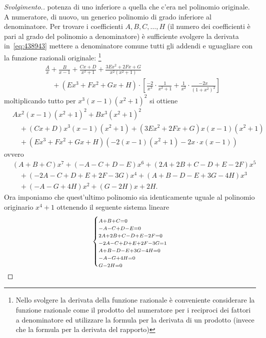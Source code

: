 \begin{proof}[Svolgimento.]
potenza di uno inferiore a quella che c'era nel polinomio originale.
A numeratore, di nuovo, un generico polinomio di grado inferiore al denominatore.
Per trovare i coefficienti $A,B,C, \dots, H$ (il numero dei coefficienti è pari al grado del polinomio a denominatore) è sufficiente
svolgere la derivata in~\eqref{eq:438943} mettere a denominatore
comune tutti gli addendi e uguagliare con la funzione razionali originale:
\footnote{%
Nello svolgere la derivata della funzione razionale è conveniente
considerare la funzione razionale come il prodotto del numeratore
per i reciproci dei fattori a denominatore ed utilizzare la formula
per la derivata di un prodotto (invece che la formula per la derivata del rapporto)%
}
\begin{align*}
  &\frac{A}{x} + \frac{B}{x-1} + \frac{Cx+D}{x^2+1}
  + \frac{3 E x^2 + 2 F x + G}{x^2(x^2+1)} \\
  & \quad + (E x^3 + F x^2 + G x + H)\cdot \left[\frac{-2}{x^3}\cdot \frac{1}{x^2+1}
  + \frac{1}{x^2}\cdot\frac{-2x}{(1+x^2)^2}\right]
\end{align*}
moltiplicando tutto per $x^3(x-1)(x^2+1)^2$ si ottiene
\begin{align*}
  &Ax^2(x-1)(x^2+1)^2 + Bx^3(x^2+1)^2 \\
  &\quad + (Cx+D)x^3(x-1)(x^2+1) + (3Ex^2+2Fx+G)x(x-1)(x^2+1)\\
  &\quad + (Ex^3+Fx^2+Gx+H)(-2(x-1)(x^2+1)-2x\cdot x(x-1))
\end{align*}
ovvero
\begin{align*}
  &(A+B+C)x^7+(-A-C+D-E)x^6 + (2A+2B+C-D+E-2F)x^5 \\
  &\quad  +(-2A-C+D+E+2F-3G)x^4 + (A+B-D-E+3G-4H)x^3 \\
  &\quad  + (-A-G+4H)x^2 + (G-2H) x + 2H.
\end{align*}
Ora imponiamo che quest'ultimo polinomio sia identicamente uguale
al polinomio originario $x^4+1$ ottenendo il seguente sistema lineare
\[
  \begin{dcases}
    \scriptstyle
    A+B+C=0 \\[-1ex]
    \scriptstyle
    -A-C+D-E=0 \\[-1ex]
    \scriptstyle
    2A + 2B + C - D + E - 2 F = 0\\[-1ex]
    \scriptstyle
    -2A-C+D+E+2F-3G = 1\\[-1ex]
    \scriptstyle
    A+B-D-E+3G-4H=0\\[-1ex]
    \scriptstyle
    -A-G+4H=0\\[-1ex]
    \scriptstyle
    G-2H=0\\[-1ex]

\end{dcases}\]
\end{proof}
